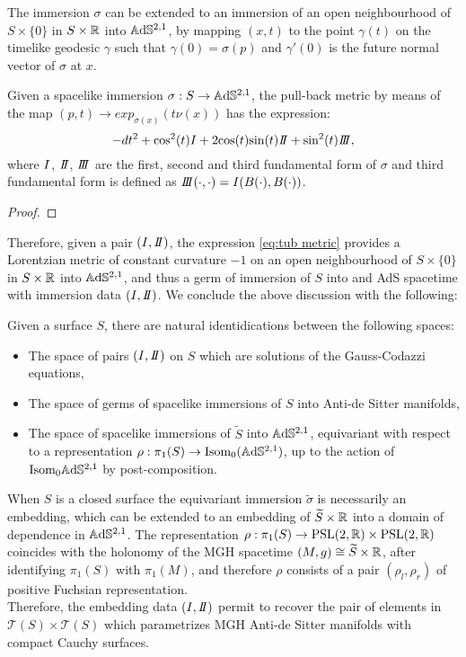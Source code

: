 The immersion $\sigma$ can be extended to an immersion of an open neighbourhood of $S \times\{0\}$ in $S\times\mathbb{R}$ into $\mathbb{A}\mathrm{d}\mathbb{S}^{2,1}$, by mapping $(x,t)$ to the point $\gamma(t)$ on the timelike geodesic $\gamma$ such that $\gamma(0)=\sigma(p)$ and $\gamma'(0)$ is the future normal vector of $\sigma$ at $x$.
\begin{lemma}\label{lem:tub metric}
    Given a spacelike immersion $\sigma:S\to \mathbb{A}\mathrm{d}\mathbb{S}^{2,1}$, the pull-back metric by means of the map $(p,t) \to exp_{\sigma(x)}(t\nu(x))$ has the expression:
    \begin{equation}\label{eq:tub metric}
        -dt^2 + \text{cos}^2(t)\I + 2\text{cos}(t)\text{sin}(t)\II + \text{sin}^2(t)\III,
    \end{equation}
    where $I$, $\II$, $\III$ are the first, second and third fundamental form of $\sigma$ and third fundamental form is defined as $\III(\cdot,\cdot)=\I(B(\cdot),B(\cdot))$.
\end{lemma}
\begin{proof}
\end{proof}
Therefore, given a pair $(\I,\II)$, the expression \ref{eq:tub metric} provides a Lorentzian metric of constant curvature $-1$ on an open neighbourhood of $S \times\{0\}$ in $S\times\mathbb{R}$ into $\mathbb{A}\mathrm{d}\mathbb{S}^{2,1}$, and thus a germ of immersion of $S$ into and AdS spacetime with immersion data $(\I,\II)$. We conclude the above discussion with the following:
\begin{proposition}\label{thm:immersion data classification}
    Given a surface $S$, there are natural identidications between the following spaces:
    \begin{itemize}
        \item The space of pairs $(\I,\II)$ on $S$ which are solutions of the Gauss-Codazzi equations,
        \item The space of germs of spacelike immersions of $S$ into Anti-de Sitter manifolds,
        \item The space of spacelike immersions of $\widetilde{S}$ into $\mathbb{A}\mathrm{d}\mathbb{S}^{2,1}$, equivariant with respect to a representation $\rho:\pi_1(S) \to \text{Isom}_0(\mathbb{A}\mathrm{d}\mathbb{S}^{2,1})$, up to the action of $\text{Isom}_0\mathbb{A}\mathrm{d}\mathbb{S}^{2,1}$ by post-composition.
    \end{itemize}
\end{proposition}
When $S$ is a closed surface the equivariant immersion $\widetilde{\sigma}$ is necessarily an embedding, which can be extended to an embedding of $\widetilde{S}\times\mathbb{R}$ into a domain of dependence in $\mathbb{A}\mathrm{d}\mathbb{S}^{2,1}$. The representation $\rho:\pi_1(S) \to \text{PSL}(2,\mathbb{R}) \times \text{PSL}(2,\mathbb{R})$ coincides with the holonomy of the MGH spacetime $(M,g) \cong \widetilde{S}\times\mathbb{R}$, after identifying $\pi_1(S)$ with $\pi_1(M)$, and therefore $\rho$ consists of a pair $(\rho_l,\rho_r)$ of positive Fuchsian representation.\\
Therefore, the embedding data $(\I,\II)$ permit to recover the pair of elements in $\mathcal{T}(S)\times\mathcal{T}(S)$ which parametrizes MGH Anti-de Sitter manifolds with compact Cauchy surfaces.

